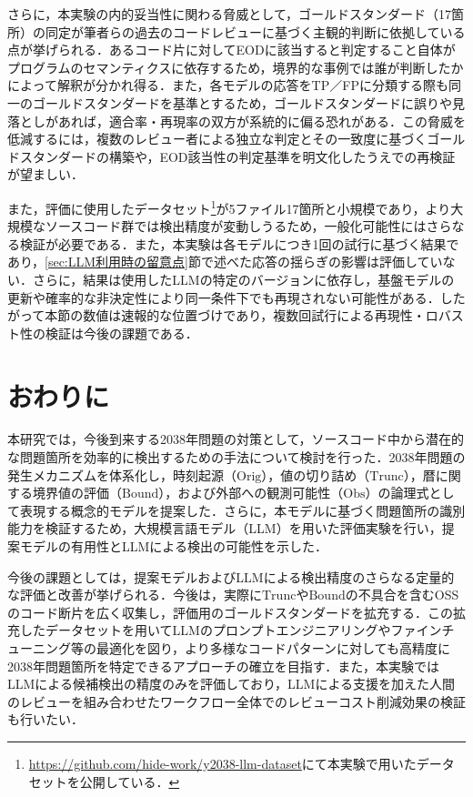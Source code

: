 \documentclass[submit,techrep,noauthor]{ipsj-lualatex}
\begin{document}
さらに，本実験の内的妥当性に関わる脅威として，ゴールドスタンダード（17箇所）の同定が筆者らの過去のコードレビューに基づく主観的判断に依拠している点が挙げられる．あるコード片に対してEODに該当すると判定すること自体がプログラムのセマンティクスに依存するため，境界的な事例では誰が判断したかによって解釈が分かれ得る．また，各モデルの応答をTP／FPに分類する際も同一のゴールドスタンダードを基準とするため，ゴールドスタンダードに誤りや見落としがあれば，適合率・再現率の双方が系統的に偏る恐れがある．この脅威を低減するには，複数のレビュー者による独立な判定とその一致度に基づくゴールドスタンダードの構築や，EOD該当性の判定基準を明文化したうえでの再検証が望ましい．

また，評価に使用したデータセット\footnote{\url{https://github.com/hide-work/y2038-llm-dataset}にて本実験で用いたデータセットを公開している．}が5ファイル17箇所と小規模であり，より大規模なソースコード群では検出精度が変動しうるため，一般化可能性にはさらなる検証が必要である．また，本実験は各モデルにつき1回の試行に基づく結果であり，\ref{sec:LLM利用時の留意点}節で述べた応答の揺らぎの影響は評価していない．さらに，結果は使用したLLMの特定のバージョンに依存し，基盤モデルの更新や確率的な非決定性により同一条件下でも再現されない可能性がある．したがって本節の数値は速報的な位置づけであり，複数回試行による再現性・ロバスト性の検証は今後の課題である．

\section{おわりに}

本研究では，今後到来する2038年問題の対策として，ソースコード中から潜在的な問題箇所を効率的に検出するための手法について検討を行った．2038年問題の発生メカニズムを体系化し，時刻起源（$\mathrm{Orig}$），値の切り詰め（$\mathrm{Trunc}$），暦に関する境界値の評価（$\mathrm{Bound}$），および外部への観測可能性（$\mathrm{Obs}$）の論理式として表現する概念的モデルを提案した．さらに，本モデルに基づく問題箇所の識別能力を検証するため，大規模言語モデル（LLM）を用いた評価実験を行い，提案モデルの有用性とLLMによる検出の可能性を示した．

今後の課題としては，提案モデルおよびLLMによる検出精度のさらなる定量的な評価と改善が挙げられる．今後は，実際に$\mathrm{Trunc}$や$\mathrm{Bound}$の不具合を含むOSSのコード断片を広く収集し，評価用のゴールドスタンダードを拡充する．この拡充したデータセットを用いてLLMのプロンプトエンジニアリングやファインチューニング等の最適化を図り，より多様なコードパターンに対しても高精度に2038年問題箇所を特定できるアプローチの確立を目指す．また，本実験ではLLMによる候補検出の精度のみを評価しており，LLMによる支援を加えた人間のレビューを組み合わせたワークフロー全体でのレビューコスト削減効果の検証も行いたい．
\end{document}
